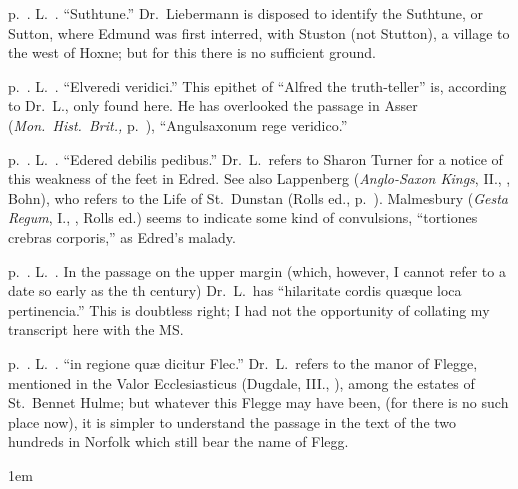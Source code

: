 \documentclass[10pt]{book}
\begin{document}
{p.\ . L.\ . ``Suthtune.'' Dr.\ Liebermann is disposed to identify the Suthtune, or Sutton, where Edmund was first interred, with Stuston (not Stutton), a village to the west of Hoxne; but for this there is no sufficient ground.

p.\ . L.\ . ``Elveredi veridici.'' This epithet of ``Alfred the truth-teller'' is, according to Dr.\ L., only found here. He has overlooked the passage in Asser (\emph{Mon.\ Hist.\ Brit.,} p.\ ), ``Angulsaxonum rege veridico.''

p.\ . L.\ . ``Edered debilis pedibus.'' Dr.\ L.\ refers to Sharon Turner for a notice of this weakness of the feet in Edred. See also Lappenberg (\emph{Anglo-Saxon Kings}, II., , Bohn), who refers to the Life of St.\ Dunstan (Rolls ed., p.\ ). Malmesbury (\emph{Gesta Regum}, I., , Rolls ed.) seems to indicate some kind of convulsions, ``tortiones crebras corporis,'' as Edred's malady.

p.\ . L.\ . In the passage on the upper margin (which, however, I cannot refer to a date so early as the th century) Dr.\ L.\ has ``hilaritate cordis qu\ae{}que loca pertinencia.'' This is doubtless right; I had not the opportunity of collating my transcript here with the MS.

p.\ . L.\ . ``in regione qu\ae{} dicitur Flec.'' Dr.\ L.\ refers to the manor of Flegge, mentioned in the Valor Ecclesiasticus (Dugdale, III., ), among the estates of St.\ Bennet Hulme; but whatever this Flegge may have been, (for there is no such place now), it is simpler to understand the passage in the text of the two hundreds in Norfolk which still bear the name of Flegg.










}















\cleardoublepage
{}
\emergencystretch 1em
\end{document}
